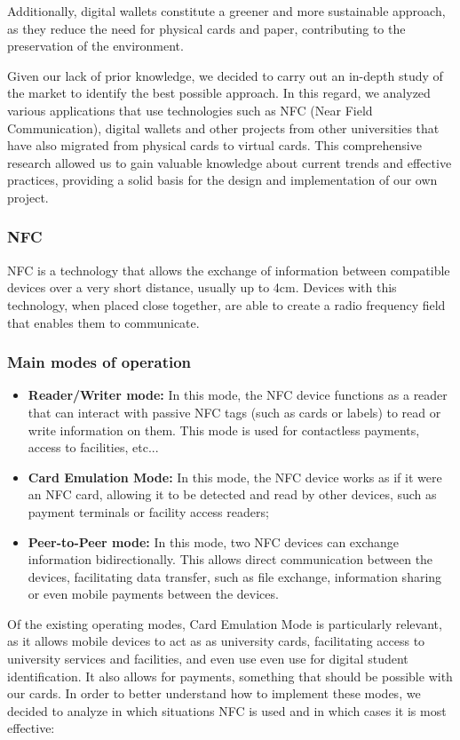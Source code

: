\documentclass[10pt]{article}
\begin{document}
Additionally, digital wallets constitute a greener and more sustainable approach, as they reduce the need for physical cards and paper, contributing to the preservation of the environment.

Given our lack of prior knowledge, we decided to carry out an in-depth study of the market to identify the best possible approach. In this regard, we analyzed various applications that use technologies such as NFC (Near Field Communication), digital wallets and other projects from other universities that have also migrated from physical cards to virtual cards. This comprehensive research allowed us to gain valuable knowledge about current trends and effective practices, providing a solid basis for the design and implementation of our own project.

\subsubsection{NFC}

NFC is a technology that allows the exchange of information between compatible devices over a very short distance, usually up to 4cm. Devices with this technology, when placed close together, are able to create a radio frequency field that enables them to communicate.

\subsubsection{Main modes of operation}
\begin{itemize}
    \item \textbf{Reader/Writer mode: } In this mode, the NFC device functions as a reader that can interact with passive NFC tags (such as cards or labels) to read or write information on them. This mode is used for contactless payments, access to facilities, etc...
    \item \textbf{Card Emulation Mode: } In this mode, the NFC device works as if it were an NFC card, allowing it to be detected and read by other devices, such as payment terminals or facility access readers;
    \item \textbf{Peer-to-Peer mode: } In this mode, two NFC devices can exchange information bidirectionally. This allows direct communication between the devices, facilitating data transfer, such as file exchange, information sharing or even mobile payments between the devices.
\end{itemize}

Of the existing operating modes, Card Emulation Mode is particularly relevant, as it allows mobile devices to act as
as university cards, facilitating access to university services and facilities, and even use
even use for digital student identification. It also allows for payments, something that should be possible with our cards.
In order to better understand how to implement these modes, we decided to analyze in which situations NFC is used and in which cases it is most effective:
\end{document}
